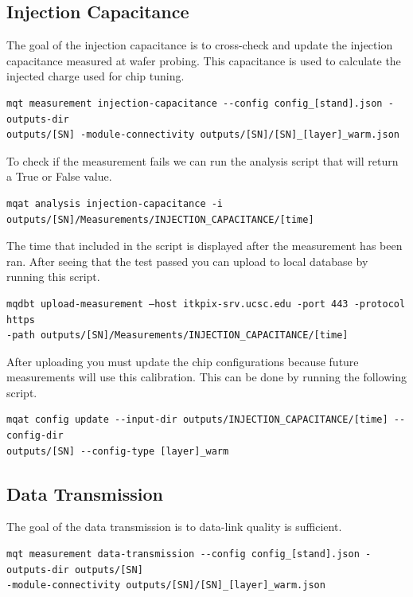 \documentclass[12pt]{article}
\begin{document}
\subsection{Injection Capacitance}

The goal of the injection capacitance is to cross-check and update the injection capacitance measured at wafer probing. This capacitance is used to calculate the injected charge used for chip tuning. 

\begin{verbatim}
mqt measurement injection-capacitance --config config_[stand].json -outputs-dir 
outputs/[SN] -module-connectivity outputs/[SN]/[SN]_[layer]_warm.json
\end{verbatim}

To check if the measurement fails we can run the analysis script that will return a True or False value. 
\begin{verbatim}
mqat analysis injection-capacitance -i outputs/[SN]/Measurements/INJECTION_CAPACITANCE/[time]
\end{verbatim}

The time that included in the script is displayed after the measurement has been ran. After seeing that the test passed you can upload to local database by running this script. 

\begin{verbatim}
mqdbt upload-measurement –host itkpix-srv.ucsc.edu -port 443 -protocol https
-path outputs/[SN]/Measurements/INJECTION_CAPACITANCE/[time]
\end{verbatim}
After uploading you must update the chip configurations because future measurements will use this calibration. This can be done by running the following script. 
\begin{verbatim}
mqat config update --input-dir outputs/INJECTION_CAPACITANCE/[time] --config-dir 
outputs/[SN] --config-type [layer]_warm
\end{verbatim}

\subsection{Data Transmission}

The goal of the data transmission is to data-link quality is sufficient.

\begin{verbatim}
mqt measurement data-transmission --config config_[stand].json -outputs-dir outputs/[SN]
-module-connectivity outputs/[SN]/[SN]_[layer]_warm.json
\end{verbatim}
\end{document}
